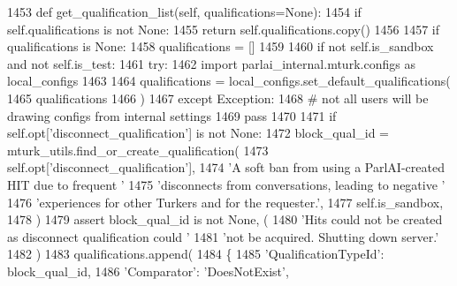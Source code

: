 \begin{DoxyCode}
1453     \textcolor{keyword}{def }get\_qualification\_list(self, qualifications=None):
1454         \textcolor{keywordflow}{if} self.qualifications \textcolor{keywordflow}{is} \textcolor{keywordflow}{not} \textcolor{keywordtype}{None}:
1455             \textcolor{keywordflow}{return} self.qualifications.copy()
1456 
1457         \textcolor{keywordflow}{if} qualifications \textcolor{keywordflow}{is} \textcolor{keywordtype}{None}:
1458             qualifications = []
1459 
1460         \textcolor{keywordflow}{if} \textcolor{keywordflow}{not} self.is\_sandbox \textcolor{keywordflow}{and} \textcolor{keywordflow}{not} self.is\_test:
1461             \textcolor{keywordflow}{try}:
1462                 \textcolor{keyword}{import} parlai\_internal.mturk.configs \textcolor{keyword}{as} local\_configs
1463 
1464                 qualifications = local\_configs.set\_default\_qualifications(
1465                     qualifications
1466                 )
1467             \textcolor{keywordflow}{except} Exception:
1468                 \textcolor{comment}{# not all users will be drawing configs from internal settings}
1469                 \textcolor{keywordflow}{pass}
1470 
1471         \textcolor{keywordflow}{if} self.opt[\textcolor{stringliteral}{'disconnect\_qualification'}] \textcolor{keywordflow}{is} \textcolor{keywordflow}{not} \textcolor{keywordtype}{None}:
1472             block\_qual\_id = mturk\_utils.find\_or\_create\_qualification(
1473                 self.opt[\textcolor{stringliteral}{'disconnect\_qualification'}],
1474                 \textcolor{stringliteral}{'A soft ban from using a ParlAI-created HIT due to frequent '}
1475                 \textcolor{stringliteral}{'disconnects from conversations, leading to negative '}
1476                 \textcolor{stringliteral}{'experiences for other Turkers and for the requester.'},
1477                 self.is\_sandbox,
1478             )
1479             \textcolor{keyword}{assert} block\_qual\_id \textcolor{keywordflow}{is} \textcolor{keywordflow}{not} \textcolor{keywordtype}{None}, (
1480                 \textcolor{stringliteral}{'Hits could not be created as disconnect qualification could '}
1481                 \textcolor{stringliteral}{'not be acquired. Shutting down server.'}
1482             )
1483             qualifications.append(
1484                 \{
1485                     \textcolor{stringliteral}{'QualificationTypeId'}: block\_qual\_id,
1486                     \textcolor{stringliteral}{'Comparator'}: \textcolor{stringliteral}{'DoesNotExist'},

\end{DoxyCode}
